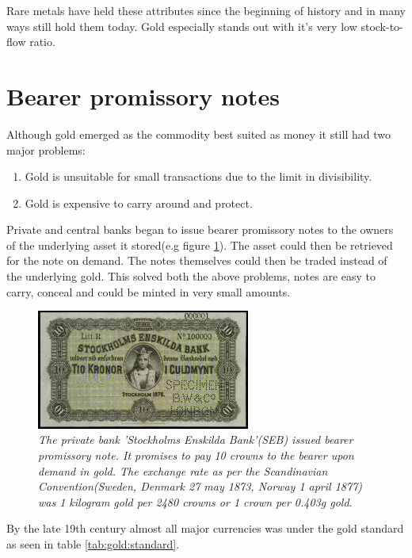 Rare metals have held these attributes since the beginning of history and in many ways still hold them today. Gold especially stands out with it's very low stock-to-flow ratio.

\section{Bearer promissory notes}

Although gold emerged as the commodity best suited as money
it still had two major problems:

\begin{enumerate}
	\item Gold is unsuitable for small transactions due to the limit in divisibility.
	\item Gold is expensive to carry around and protect.
\end{enumerate}

Private and central banks began to issue bearer promissory notes to the owners of the underlying asset it stored(e.g figure \ref{fig:seb:promissory:note}). 
The asset could then be retrieved for the note on demand. The notes themselves could then be traded 
instead of the underlying gold. This solved both the above problems, notes are easy to carry, conceal and 
could be minted in very small amounts. 

\begin{figure}[!htb]

	\centering
	\includegraphics[width=7cm]{PrivateBankNoteStockholmEnskildaBank1876.JPG}
	\caption{\textit{The private bank 'Stockholms Enskilda Bank'(SEB) issued bearer
	promissory note. It promises to pay 10 crowns to the bearer upon demand in gold. 
	The exchange rate as per the Scandinavian Convention(Sweden, Denmark 27 may 1873, Norway 1 april 1877)\cite{nordic:crown}
	was 1 kilogram gold per 2480 crowns or 1 crown per 0.403g gold\cite{crown:gold}. 
 }}
	\label{fig:seb:promissory:note}
\end{figure}

By the late 19th century almost all major currencies was under the gold standard as seen in table \ref{tab:gold:standard}.

